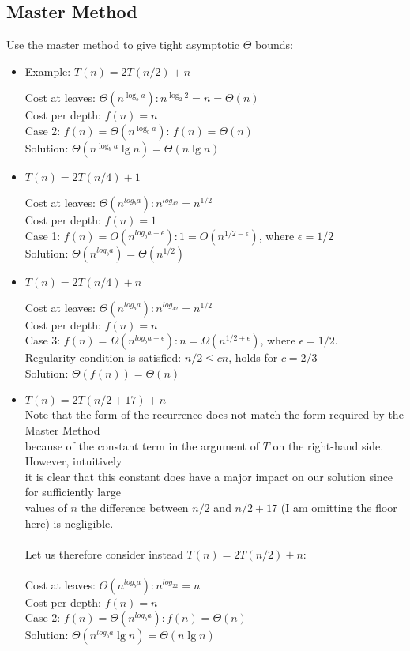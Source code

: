 \documentclass[a4paper]{article}
\begin{document}
\subsection{Master Method}

Use the master method to give tight asymptotic $\Theta$ bounds:

\begin{itemize}

\item Example: $T(n) = 2T(n/2) + n$

Cost at leaves: $\Theta(n^{\log_b a}): n^{\log_2 2}=n=\Theta(n)$ \\
Cost per depth: $f(n)=n$ \\
Case 2: $f(n) = \Theta(n^{\log_b a})$: $f(n) = \Theta(n)$ \\
Solution: $\Theta(n^{\log_b a} \lg n) = \Theta(n \lg n)$

\item $T(n) = 2T(n/4) + 1$

Cost at leaves: $\Theta(n^{log_ba}): n^{log_42} = n^{1/2} $\\
Cost per depth: $f(n) = 1$ \\
Case 1: $f(n) = O(n^{log_ba-\epsilon}): 1 = O(n^{1/2-\epsilon})$, where $\epsilon = 1/2$\\
Solution: $\Theta(n^{log_ba}) = \Theta(n^{1/2})$
\item $T(n) = 2T(n/4) + n$

Cost at leaves: $\Theta(n^{log_ba}): n^{log_42} = n^{1/2} $\\
Cost per depth: $f(n) = n$ \\
Case 3: $f(n) = \Omega(n^{log_ba + \epsilon}): n = \Omega(n^{1/2+\epsilon})$, where $\epsilon = 1/2$. \\
Regularity condition is satisfied: $n/2 \leq cn$, holds for $c = 2/3$ \\
Solution: $\Theta(f(n)) = \Theta(n)$

\item $T(n) = 2T(n/2 + 17) + n$ \\
Note that the form of the recurrence does not match the form required by the Master Method \\
because of the constant term in the argument of $T$ on the right-hand side. However, intuitively \\
it is clear that this constant does have a major impact on our solution since for sufficiently large \\
values of $n$ the difference between $n/2$ and $n/2 + 17$ (I am omitting the floor here) is negligible. \\ \\
Let us therefore consider instead $T(n) = 2T(n/2) + n$: \\ \\
Cost at leaves: $\Theta(n^{log_ba}): n^{log_22} = n$ \\
Cost per depth: $f(n) = n$ \\ 
Case 2: $f(n) = \Theta(n^{log_ba}): f(n) = \Theta(n)$ \\
Solution: $\Theta(n^{log_ba}\lg n) = \Theta(n \lg n)$


\end{itemize}
\end{document}
